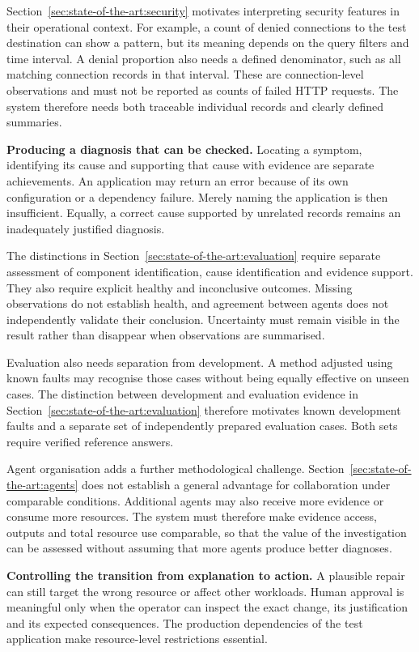 Section~\ref{sec:state-of-the-art:security} motivates interpreting security
features in their operational context. For example, a count of denied
connections to the test destination can show a pattern, but its meaning
depends on the query filters and time interval. A denial proportion also
needs a defined denominator, such as all matching connection records in
that interval. These are connection-level observations and must not be
reported as counts of failed HTTP requests. The system therefore needs
both traceable individual records and clearly defined summaries.

\noindent\textbf{Producing a diagnosis that can be checked.}
Locating a symptom, identifying its cause and supporting that cause with
evidence are separate achievements. An application may return an error
because of its own configuration or a dependency failure. Merely naming
the application is then insufficient. Equally, a correct cause supported
by unrelated records remains an inadequately justified diagnosis.

The distinctions in Section~\ref{sec:state-of-the-art:evaluation} require
separate assessment of component identification, cause identification and
evidence support. They also require explicit healthy and inconclusive
outcomes. Missing observations do not establish health, and agreement
between agents does not independently validate their conclusion.
Uncertainty must remain visible in the result rather than disappear when
observations are summarised.

Evaluation also needs separation from development. A method adjusted using
known faults may recognise those cases without being equally effective on
unseen cases. The distinction between development and evaluation evidence
in Section~\ref{sec:state-of-the-art:evaluation} therefore motivates known
development faults and a separate set of independently prepared evaluation
cases. Both sets require verified reference answers.

Agent organisation adds a further methodological challenge.
Section~\ref{sec:state-of-the-art:agents} does not establish a general
advantage for collaboration under comparable conditions. Additional agents
may also receive more evidence or consume more resources. The system must
therefore make evidence access, outputs and total resource use comparable,
so that the value of the investigation can be assessed without assuming
that more agents produce better diagnoses.

\noindent\textbf{Controlling the transition from explanation to action.}
A plausible repair can still target the wrong resource or affect other
workloads. Human approval is meaningful only when the operator can inspect
the exact change, its justification and its expected consequences. The
production dependencies of the test application make resource-level
restrictions essential.

